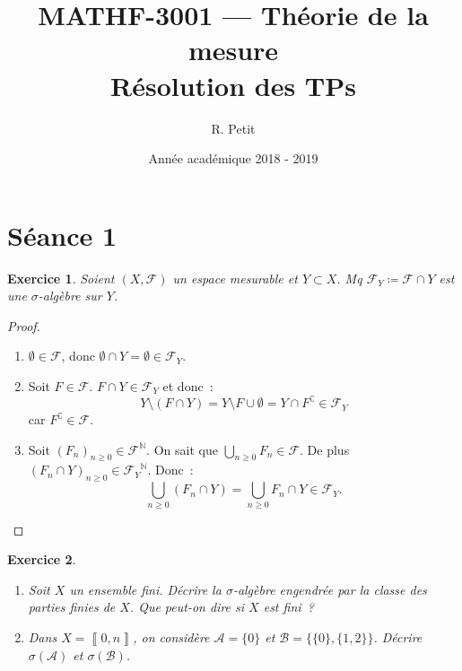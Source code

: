 \documentclass{article}
\title{MATHF-3001 --- Théorie de la mesure \\Résolution des TPs}
\author{R. Petit}
\date{Année académique 2018 - 2019}
\newtheorem{ex}{Exercice}[section]
\newcommand{\C}{\complement}
\newcommand{\N}{{\mathbb N}}
\newcommand{\intint}[2]{\left\llbracket#1, #2\right\rrbracket}
\begin{document}
\maketitle

\section{Séance 1}

\begin{ex} Soient $(X, \mathcal F)$ un espace mesurable et $Y \subset X$. Mq $\mathcal F_Y \coloneqq \mathcal F \cap Y$ est une $\sigma$-algèbre sur $Y$.
\end{ex}

\begin{proof}~
\begin{enumerate}
	\item $\emptyset \in \mathcal F$, donc $\emptyset \cap Y = \emptyset \in \mathcal F_Y$.
	\item Soit $F \in \mathcal F$. $F \cap Y \in \mathcal F_Y$ et donc~:
	\[Y \setminus (F \cap Y) = Y \setminus F \cup \emptyset = Y \cap F^\C \in \mathcal F_Y\]
	car $F^\C \in \mathcal F$.
	\item Soit $(F_n)_{n \geq 0} \in \mathcal F^\N$. On sait que $\bigcup_{n \geq 0}F_n \in \mathcal F$. De plus $(F_n \cap Y)_{n \geq 0} \in {\mathcal F_Y}^\N$. Donc~:
	\[\bigcup_{n \geq 0}(F_n \cap Y) = \bigcup_{n \geq 0}F_n \cap Y \in \mathcal F_Y.\]
\end{enumerate}
\end{proof}

\begin{ex}~
\begin{enumerate}
	\item Soit $X$ un ensemble fini. Décrire la $\sigma$-algèbre engendrée par la classe des parties finies de $X$. Que peut-on dire si $X$ est fini~?
	\item Dans $X = \intint 0n$, on considère $\mathcal A = \{0\}$ et $\mathcal B = \{\{0\}, \{1, 2\}\}$. Décrire $\sigma(\mathcal A)$ et $\sigma(\mathcal B)$.
\end{enumerate}
\end{ex}
\end{document}
